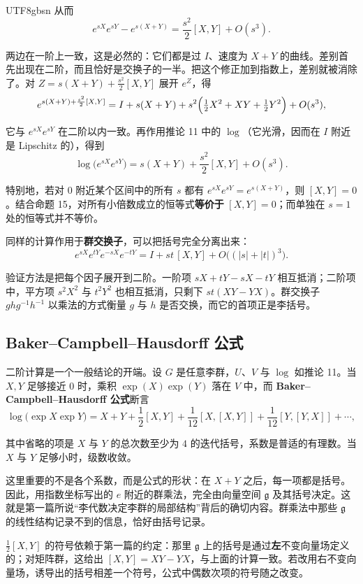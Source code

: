 \documentclass[11pt]{article}
\begin{document}
\begin{CJK*}{UTF8}{gbsn}
从而
\[
e^{sX} e^{sY} - e^{s(X+Y)} = \frac{s^2}{2}[X, Y] + O(s^3).
\]

两边在一阶上一致，这是必然的：它们都是过 $I$、速度为 $X + Y$ 的曲线。差别首先出现在二阶，而且恰好是交换子的一半。把这个修正加到指数上，差别就被消除了。对 $Z = s(X + Y) + \frac{s^2}{2}[X, Y]$ 展开 $e^Z$，得
\[
e^{s(X+Y) + \frac{s^2}{2}[X, Y]} = I + s(X+Y) + s^2\Bigl(\tfrac12 X^2 + XY + \tfrac12 Y^2\Bigr) + O(s^3),
\]

它与 $e^{sX}e^{sY}$ 在二阶以内一致。再作用推论 11 中的 $\log$（它光滑，因而在 $I$ 附近是 Lipschitz 的），得到
\[
\log\bigl(e^{sX} e^{sY}\bigr) = s(X + Y) + \frac{s^2}{2}[X, Y] + O(s^3).
\]

特别地，若对 $0$ 附近某个区间中的所有 $s$ 都有 $e^{sX}e^{sY} = e^{s(X+Y)}$，则 $[X, Y] = 0$。结合命题 15，对所有小倍数成立的恒等式\textbf{等价于} $[X, Y] = 0$；而单独在 $s = 1$ 处的恒等式并不等价。

同样的计算作用于\textbf{群交换子}，可以把括号完全分离出来：
\[
e^{sX} e^{tY} e^{-sX} e^{-tY} = I + st\,[X, Y] + O\bigl((|s| + |t|)^3\bigr).
\]

验证方法是把每个因子展开到二阶。一阶项 $sX + tY - sX - tY$ 相互抵消；二阶项中，平方项 $s^2X^2$ 与 $t^2Y^2$ 也相互抵消，只剩下 $st(XY - YX)$。群交换子 $ghg^{-1}h^{-1}$ 以乘法的方式衡量 $g$ 与 $h$ 是否交换，而它的首项正是李括号。

\subsection{Baker–Campbell–Hausdorff 公式}

二阶计算是一个一般结论的开端。设 $G$ 是任意李群，$U$、$V$ 与 $\log$ 如推论 11。当 $X, Y$ 足够接近 $0$ 时，乘积 $\exp(X)\exp(Y)$ 落在 $V$ 中，而 \textbf{Baker–Campbell–Hausdorff 公式}断言
\[
\boxed{
\log\bigl(\exp X \exp Y\bigr) = X + Y + \frac12 [X, Y] + \frac1{12}[X, [X, Y]] + \frac1{12}[Y, [Y, X]] + \cdots,
}
\]

其中省略的项是 $X$ 与 $Y$ 的总次数至少为 $4$ 的迭代括号，系数是普适的有理数。当 $X$ 与 $Y$ 足够小时，级数收敛。

这里重要的不是各个系数，而是公式的形状：在 $X + Y$ 之后，每一项都是括号。因此，用指数坐标写出的 $e$ 附近的群乘法，完全由向量空间 $\mathfrak{g}$ 及其括号决定。这就是第一篇所说“李代数决定李群的局部结构”背后的确切内容。群乘法中那些 $\mathfrak{g}$ 的线性结构记录不到的信息，恰好由括号记录。

$\frac12[X, Y]$ 的符号依赖于第一篇的约定：那里 $\mathfrak{g}$ 上的括号是通过\textbf{左}不变向量场定义的；对矩阵群，这给出 $[X, Y] = XY - YX$，与上面的计算一致。若改用右不变向量场，诱导出的括号相差一个符号，公式中偶数次项的符号随之改变。


\end{CJK*}
\end{document}
